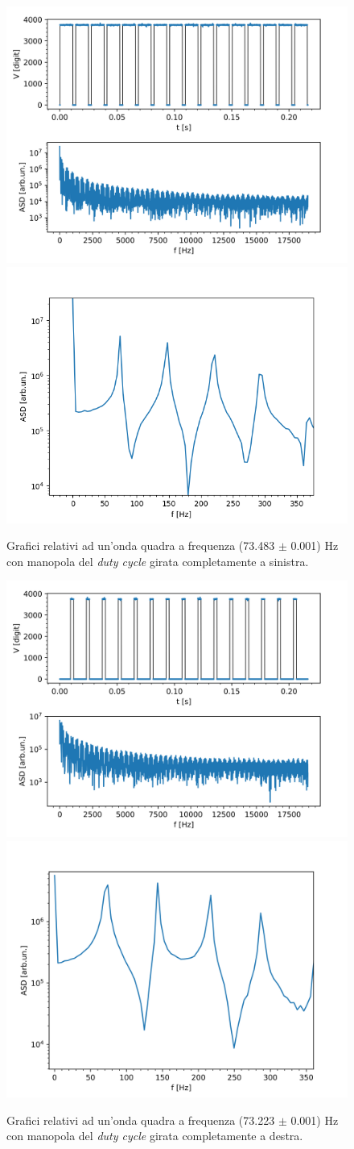 \documentclass{article}[a4paper, oneside,11pt]
\begin{document}
\begin{figure}[H]
    \centering
    \includegraphics[width=0.45\columnwidth]{img/ese5/f73_QS}
    \includegraphics[width=0.48\columnwidth]{img/ese5/f73_QS-tagl}
    \caption{Grafici relativi ad un'onda quadra a frequenza (73.483 $\pm$ 0.001) Hz con manopola del \textit{duty cycle} girata completamente a sinistra.}
    \label{fig:ese5-duty-sx}
\end{figure}

\begin{figure}[H]
    \centering
    \includegraphics[width=0.45\columnwidth]{img/ese5/f73_QD}
    \includegraphics[width=0.48\columnwidth]{img/ese5/f73_QD-tagl}
    \caption{Grafici relativi ad un'onda quadra a frequenza (73.223 $\pm$ 0.001) Hz con manopola del \textit{duty cycle} girata completamente a destra.}
    \label{fig:ese5-duty-dx}
\end{figure}
\end{document}

